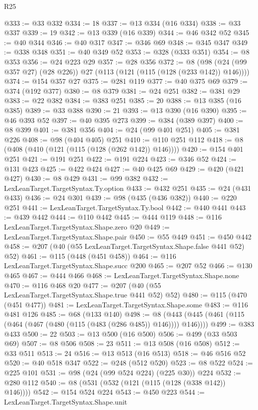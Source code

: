\begin{lexlean}{R25}
\begin{coremodule}
@333 := @33 @332
@334 := 18
@337 := @13 @334 (@16 @334)
@338 := @33 @337
@339 := 19
@342 := @13 @339 (@16 @339)
@344 := @46 @342 @52
@345 := @40 @344
@346 := @40 @317
@347 := @346 @69
@348 := @345 @347
@349 := @338 @348
@351 := @40 @349 @52
@353 := @328 (@333 @351)
@354 := @8 @353
@356 := @24 @223 @29
@357 := @28 @356
@372 := @8 (@98 (@24 (@99 @357 @27) (@28 @226)) @27 (@113 (@121 (@115 (@128 (@233 @142)) @146))))
@374 := @154 @357 @27
@375 := @281 @119
@377 := @40 @375 @69
@379 := @374 (@192 @377)
@380 := @8 @379
@381 := @24 @251
@382 := @381 @29
@383 := @22 @382
@384 := @383 @251
@385 := 20
@388 := @13 @385 (@16 @385)
@389 := @33 @388
@390 := 21
@393 := @13 @390 (@16 @390)
@395 := @46 @393 @52
@397 := @40 @395 @273
@399 := @384 (@389 @397)
@400 := @8 @399
@401 := @381 @356
@404 := @24 (@99 @401 @251)
@405 := @381 @226
@408 := @98 (@404 @405) @251
@410 := @110 @251 @112
@418 := @8 (@408 (@410 (@121 (@115 (@128 (@262 @142)) @146))))
@420 := @154 @401 @251
@421 := @191 @251
@422 := @191 @224
@423 := @346 @52
@424 := @131 @423
@425 := @422 @424
@427 := @40 @425 @69
@429 := @420 (@421 @427)
@430 := @8 @429
@431 := @99 @382
@432 := LexLeanTarget.TargetSyntax.Ty.option
@433 := @432 @251
@435 := @24 (@431 @433)
@436 := @24 @301
@439 := @98 (@435 (@436 @382))
@440 := @220 @251
@441 := LexLeanTarget.TargetSyntax.Ty.bool
@442 := @440 @441
@443 := @439 @442
@444 := @110 @442
@445 := @444 @119
@448 := @116 LexLeanTarget.TargetSyntax.Shape.zero @20
@449 := LexLeanTarget.TargetSyntax.Shape.pair
@450 := @55 @449
@451 := @450 @442
@458 := @207 (@40 (@55 LexLeanTarget.TargetSyntax.Shape.false @441 @52) @52)
@461 := @115 (@448 (@451 @458))
@464 := @116 LexLeanTarget.TargetSyntax.Shape.succ @200
@465 := @207 @52
@466 := @130 @465
@467 := @444 @466
@468 := LexLeanTarget.TargetSyntax.Shape.none
@470 := @116 @468 @20
@477 := @207 (@40 (@55 LexLeanTarget.TargetSyntax.Shape.true @441 @52) @52)
@480 := @115 (@470 (@451 @477))
@481 := LexLeanTarget.TargetSyntax.Shape.some
@483 := @116 @481 @126
@485 := @68 (@133 @140)
@498 := @8 (@443 (@445 (@461 (@115 (@464 (@467 (@480 (@115 (@483 (@286 @485)) @146)))) @146))))
@499 := @383 @433
@500 := 22
@503 := @13 @500 (@16 @500)
@506 := @499 (@33 @503 @69)
@507 := @8 @506
@508 := 23
@511 := @13 @508 (@16 @508)
@512 := @33 @511
@513 := 24
@516 := @13 @513 (@16 @513)
@518 := @46 @516 @52
@520 := @40 @518 @347
@522 := @248 (@512 @520)
@523 := @8 @522
@524 := @225 @101
@531 := @98 (@24 (@99 @524 @224) (@225 @30)) @224
@532 := @280 @112
@540 := @8 (@531 (@532 (@121 (@115 (@128 (@338 @142)) @146))))
@542 := @154 @524 @224
@543 := @450 @223
@544 := LexLeanTarget.TargetSyntax.Shape.unit

\end{coremodule}
\end{lexlean}
